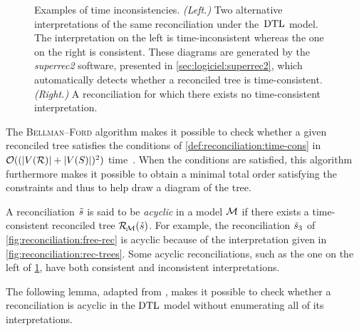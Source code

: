 \begin{figure}[htb]
    \capstart
    \centering
    
    \caption[Examples of time inconsistencies]{
        Examples of time inconsistencies.
        \emph{(Left.)}
        Two alternative interpretations of the same reconciliation under the~\(\mathrm{D}\mathrm{T}\mathrm{L}\) model.
        The interpretation on the left is time-inconsistent whereas the one on the right is consistent.
        These diagrams are generated by the \emph{superrec2} software, presented in \cref{sec:logiciel:superrec2}, which automatically detects whether a reconciled tree is time-consistent.
        \emph{(Right.)}
        A reconciliation for which there exists no time-consistent interpretation.
    }
    \label{fig:reconciliation:time-cons}
\end{figure}

The \textsc{Bellman--Ford} algorithm makes it possible to check whether a given reconciled tree satisfies the conditions of \cref{def:reconciliation:time-cons} in \(\operatorname{\mathcal{O}}((|V(\mathcal{R})| + |V(S)|)^2)\) time~\parencite[section~22.4]{Cormen2022IntroductionAlgorithms}.
When the conditions are satisfied, this algorithm furthermore makes it possible to obtain a minimal total order satisfying the constraints and thus to help draw a diagram of the tree.

A reconciliation \(\tilde{s}\) is said to be \emph{acyclic} in a model \(\mathcal{M}\) if there exists a time-consistent reconciled tree \(\mathcal{R}_{\!\mathcal{M}}(\tilde{s})\).
For example, the reconciliation \(\tilde{s}_3\) of \cref{fig:reconciliation:free-rec} is acyclic because of the interpretation given in \cref{fig:reconciliation:rec-trees}.
Some acyclic reconciliations, such as the one on the left of \cref{fig:reconciliation:time-cons}, have both consistent and inconsistent interpretations.

The following lemma, adapted from \textcite[theorem 1]{Tofigh2009InferringDuplicationsLateral}, makes it possible to check whether a reconciliation is acyclic in the \(\mathrm{D}\mathrm{T}\mathrm{L}\) model without enumerating all of its interpretations.

